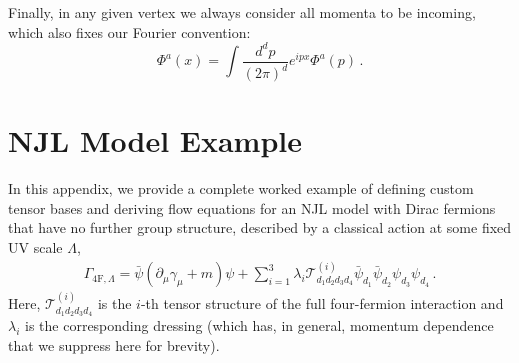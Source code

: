 \documentclass[preprint,10pt,sort&compress]{elsarticle}
\begin{document}
Finally, in any given vertex we always consider all momenta to be incoming, which also fixes our Fourier convention:
%
\begin{equation}
	\Phi^a(x) = \int \frac{d^d p}{(2\pi)^d} e^{ipx}\Phi^a(p)
	\,.
\end{equation}


\section{NJL Model Example}
\label{app:NJL}

In this appendix, we provide a complete worked example of defining custom tensor bases and deriving flow equations for an NJL model \cite{Klevansky:1992qe} with Dirac fermions that have no further group structure, described by a classical action at some fixed UV scale $\Lambda$,
%
\begin{align}
	\Gamma_{\textrm{4F},\Lambda} = \bar\psi (\partial_\mu\gamma_\mu + m)\psi + \sum_{i=1}^3 \lambda_i\mathcal{T}^{(i)}_{d_1d_2d_3d_4}\bar\psi_{d_1}\bar\psi_{d_2}\psi_{d_3}\psi_{d_4}\,.
\end{align}
%
Here, $\mathcal{T}^{(i)}_{d_1d_2d_3d_4}$ is the $i$-th tensor structure of the full four-fermion interaction and $\lambda_i$ is the corresponding dressing (which has, in general, momentum dependence that we suppress here for brevity).
\end{document}
